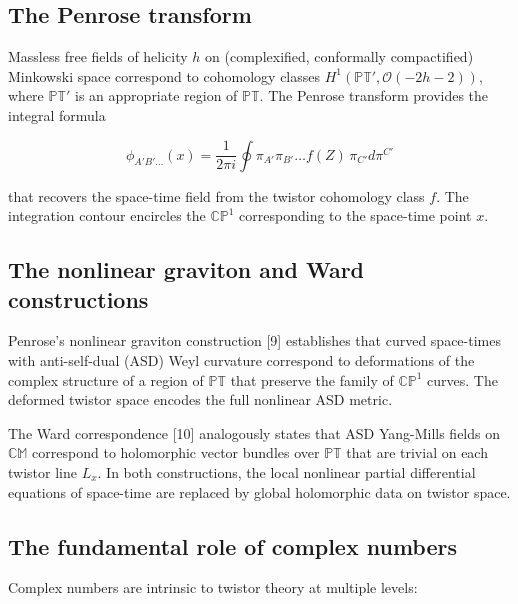 \documentclass[12pt]{article}
\begin{document}
\subsection{The Penrose transform}\label{the-penrose-transform}

Massless free fields of helicity \(h\) on (complexified, conformally
compactified) Minkowski space correspond to cohomology classes
\(H^1(\mathbb{PT}', \mathcal{O}(-2h-2))\), where \(\mathbb{PT}'\) is an
appropriate region of \(\mathbb{PT}\). The Penrose transform provides
the integral formula

\[
\phi_{A'B'\dots}(x) = \frac{1}{2\pi i} \oint \pi_{A'} \pi_{B'} \dots f(Z) \, \pi_{C'} d\pi^{C'}
\]

that recovers the space-time field from the twistor cohomology class
\(f\). The integration contour encircles the \(\mathbb{CP}^1\)
corresponding to the space-time point \(x\).

\subsection{The nonlinear graviton and Ward constructions}\label{the-nonlinear-graviton-and-ward-constructions}

Penrose's nonlinear graviton construction {[}9{]} establishes that
curved space-times with anti-self-dual (ASD) Weyl curvature correspond
to deformations of the complex structure of a region of \(\mathbb{PT}\)
that preserve the family of \(\mathbb{CP}^1\) curves. The deformed
twistor space encodes the full nonlinear ASD metric.

The Ward correspondence {[}10{]} analogously states that ASD Yang-Mills
fields on \(\mathbb{CM}\) correspond to holomorphic vector bundles over
\(\mathbb{PT}\) that are trivial on each twistor line \(L_x\). In both
constructions, the local nonlinear partial differential equations of
space-time are replaced by global holomorphic data on twistor space.

\subsection{The fundamental role of complex numbers}\label{the-fundamental-role-of-complex-numbers}

Complex numbers are intrinsic to twistor theory at multiple levels:
\end{document}
